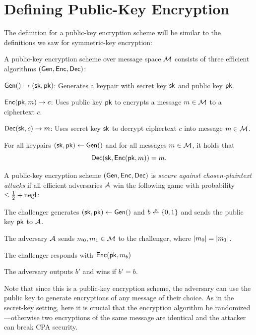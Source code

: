 \section{Defining Public-Key Encryption}

The definition for a public-key encryption scheme will be similar to the 
definitions we saw for symmetric-key encryption:

\begin{definition}
	A public-key encryption scheme over message space $\mathcal{M}$ 
  consists of three efficient algorithms $(\mathsf{Gen}, \mathsf{Enc}, \mathsf{Dec})$:
	\begin{compactitem}
    \item $\mathsf{Gen}() \to ({\mathsf{sk}}, \mathsf{pk})$: Generates a keypair with secret key ${\mathsf{sk}}$ and public key $\mathsf{pk}$.
    \item $\mathsf{Enc}(\mathsf{pk}, m) \to c$: Uses public key $\mathsf{pk}$ to encrypts a message $m \in \mathcal{M}$ 
            to a ciphertext $c$.
    \item $\mathsf{Dec}({\mathsf{sk}}, c) \to m$: Uses secret key ${\mathsf{sk}}$ to decrypt ciphertext $c$ into message $m \in \mathcal{M}$.
	\end{compactitem}
\end{definition}

\begin{definition}
For all keypairs $({\mathsf{sk}}, \mathsf{pk}) \gets \mathsf{Gen}()$ and for all messages $m \in \mathcal{M}$,
it holds that $$\mathsf{Dec}({\mathsf{sk}}, \mathsf{Enc}(\mathsf{pk}, m)) = m.$$
\end{definition}

\begin{definition}
  A public-key encryption scheme $(\mathsf{Gen}, \mathsf{Enc}, \mathsf{Dec})$ is \emph{secure against chosen-plaintext attacks}
  if all efficient adversaries $\mathcal{A}$ 
  win the following game with probability $\leq \tfrac{1}{2} + \operatorname{negl}$:

	\begin{compactitem}
  \item The challenger generates $({\mathsf{sk}}, \mathsf{pk}) \gets \mathsf{Gen}()$ and $b \getsr \bin$ and sends 
        the public key $\mathsf{pk}$ to $\mathcal{A}$.
  \item The adversary $\mathcal{A}$ sends $m_0, m_1 \in \mathcal{M}$ to the challenger,
        where $\left| m_0 \right| = \left| m_1 \right|$.
  \item The challenger responds with $\mathsf{Enc}(\mathsf{pk}, m_b)$		
  \item The adversary outputs $b'$ and wins if $b' = b$.
	\end{compactitem}
\end{definition}
Note that since this is a public-key encryption
scheme, the adversary can use the public key to
generate encryptions of any message of their choice. 
As in the secret-key setting, here it is crucial that
the encryption algorithm be randomized---otherwise
two encryptions of the same message are identical
and the attacker can break CPA security.

